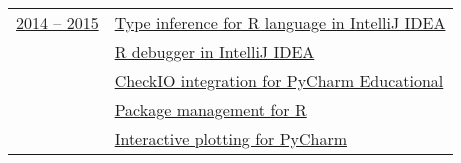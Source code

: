 \documentclass[letterpaper,11pt,oneside]{article}
\begin{document}
\noindent \begin{tabular}{@{} l l}


\underline{2014 -- 2015} &  \hspace{10mm}\href{https://github.com/medvector/TheRPlugin}{Type inference for R language in IntelliJ IDEA}   \\
                         &  \hspace{10mm}\href{https://github.com/holgerbrandl/r4intellij}{R debugger in IntelliJ IDEA} \\
                         &  \hspace{10mm}\href{https://github.com/evgraph/CheckIOPyCharmPlugin}{CheckIO integration for PyCharm Educational} \\
                         &  \hspace{10mm}\href{https://github.com/avesloguzova/TheRPlugin}{Package management for R} \\                                                          
                         &  \hspace{10mm}\href{https://github.com/cexcell/pycharm_interactive_charts}{Interactive plotting for PyCharm} \vspace{1em} \\

\end{tabular}
\end{document}
